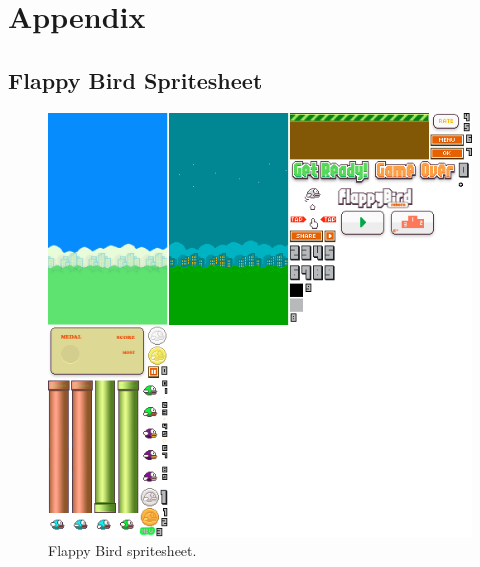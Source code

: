 \section{Appendix}
\subsection{Flappy Bird Spritesheet}
\begin{figure}[h!]
\centering\includegraphics[width=\linewidth]{design/figures/leaky-spritesheet.png}
\caption{Flappy Bird spritesheet.}
\label{fig:leaky-spritesheet}
\end{figure}
\clearpage